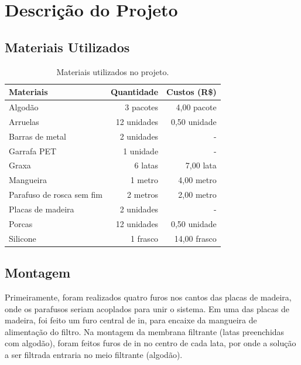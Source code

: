 \chapter{Descrição do Projeto}\label{descricao}

\section{Materiais Utilizados}

\begin{table}[H]
\centering
\caption{Materiais utilizados no projeto.}
\label{tab:materiais}
\begin{tabular}{lrr}
\multicolumn{1}{l}{\textbf{Materiais}} & \multicolumn{1}{l}{\textbf{Quantidade}} & \multicolumn{1}{l}{\textbf{Custos (R\$)}} \\\toprule
Algodão                   & 3 pacotes   & 4,00 pacote  \\
Arruelas                  & 12 unidades & 0,50 unidade \\
Barras de metal           & 2 unidades  & -            \\
Garrafa PET               & 1 unidade   & -            \\
Graxa                     & 6 latas     & 7,00 lata    \\
Mangueira                 & 1 metro     & 4,00 metro   \\
Parafuso de rosca sem fim & 2 metros    & 2,00 metro   \\
Placas de madeira         & 2 unidades  & -            \\
Porcas                    & 12 unidades & 0,50 unidade \\
Silicone                  & 1 frasco    & 14,00 frasco \\ \bottomrule
\end{tabular}
\end{table}

\section{Montagem}
\label{sec:montagem}

Primeiramente, foram realizados quatro furos nos cantos das placas de madeira,
onde os parafusos seriam acoplados para unir o sistema. Em uma das placas de
madeira, foi feito um furo central de  \si{in}, para encaixe da
mangueira de alimentação do filtro. Na montagem da membrana filtrante (latas
preenchidas com algodão), foram feitos furos de  \si{in} no
centro de cada lata, por onde a solução a ser filtrada entraria no meio
filtrante (algodão).

